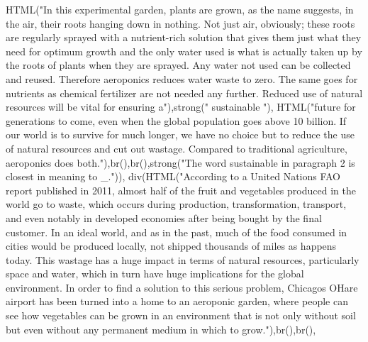 \documentclass[
]{article}
\newenvironment{Shaded}{\begin{snugshade}}{\end{snugshade}}
\newcommand{\FunctionTok}[1]{\textcolor[rgb]{0.00,0.00,0.00}{#1}}
\newcommand{\NormalTok}[1]{#1}
\newcommand{\StringTok}[1]{\textcolor[rgb]{0.31,0.60,0.02}{#1}}
\begin{document}
\begin{Shaded}
\begin{Highlighting}[]
               \FunctionTok{HTML}\NormalTok{(}\StringTok{"In this experimental garden, plants are grown, as the name suggests, in the air, their roots hanging down in nothing. Not just air, obviously; these roots are regularly sprayed with a nutrient{-}rich solution that gives them just what they need for optimum growth and the only water used is what is actually taken up by the roots of plants when they are sprayed. Any water not used can be collected and reused. Therefore aeroponics reduces water waste to zero. The same goes for nutrients as chemical fertilizer are not needed any further. Reduced use of natural resources will be vital for ensuring a"}\NormalTok{),}\FunctionTok{strong}\NormalTok{(}\StringTok{" sustainable "}\NormalTok{), }\FunctionTok{HTML}\NormalTok{(}\StringTok{"future for generations to come, even when the global population goes above 10 billion. If our world is to survive for much longer, we have no choice but to reduce the use of natural resources and cut out wastage.  Compared to traditional agriculture, aeroponics does both."}\NormalTok{),}\FunctionTok{br}\NormalTok{(),}\FunctionTok{br}\NormalTok{(),}\FunctionTok{strong}\NormalTok{(}\StringTok{"The word \textquotesingle{}sustainable\textquotesingle{} in paragraph 2 is closest in meaning to \_."}\NormalTok{)),}
           \FunctionTok{div}\NormalTok{(}\FunctionTok{HTML}\NormalTok{(}\StringTok{"According to a United Nations FAO report published in 2011, almost half of the fruit and vegetables produced in the world go to waste, which occurs during production, transformation, transport, and even  notably in developed economies  after being bought by the final customer. In an ideal world, and as in the past, much of the food consumed in cities would be produced locally, not shipped thousands of miles as happens today. This wastage has a huge impact in terms of natural resources, particularly space and water, which in turn have huge implications for the global environment. In order to find a solution to this serious problem, Chicago\textquotesingle{}s O\textquotesingle{}Hare airport has been turned into a home to an aeroponic garden, where people can see how vegetables can be grown in an environment that is not only without soil but even without any permanent medium in which to grow."}\NormalTok{),}\FunctionTok{br}\NormalTok{(),}\FunctionTok{br}\NormalTok{(), }

\end{Highlighting}
\end{Shaded}
\end{document}
